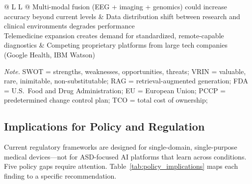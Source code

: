 \begin{table}[!htbp]
\begin{tabularx}{\textwidth}{@{} L L @{}}
\addlinespace
Multi-modal fusion (EEG + imaging + genomics) could increase accuracy beyond current levels & Data distribution shift between research and clinical environments degrades performance \\
\addlinespace
Telemedicine expansion creates demand for standardized, remote-capable diagnostics & Competing proprietary platforms from large tech companies (Google Health, IBM Watson) \\
\bottomrule
\end{tabularx}
\vspace{0.5em}\noindent\textit{Note.} SWOT = strengths, weaknesses, opportunities, threats; VRIN = valuable, rare, inimitable, non-substitutable; RAG = retrieval-augmented generation; FDA = U.S.\ Food and Drug Administration; EU = European Union; PCCP = predetermined change control plan; TCO = total cost of ownership; 
\end{table}

\subsection{Implications for Policy and Regulation}

Current regulatory frameworks are designed for single-domain, single-purpose medical devices---not for ASD-focused AI platforms that learn across conditions. Five policy gaps require attention. Table~\ref{tab:policy_implications} maps each finding to a specific recommendation.

